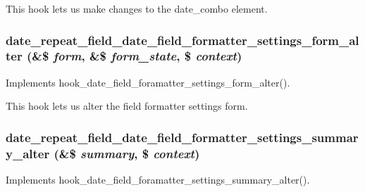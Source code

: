 This hook lets us make changes to the date\_\-combo element. \hypertarget{date__repeat__field_8module_af98bfac81550fc3d718f9b068c51e301}{
\subsubsection[{date\_\-repeat\_\-field\_\-date\_\-field\_\-formatter\_\-settings\_\-form\_\-alter}]{\setlength{\rightskip}{0pt plus 5cm}date\_\-repeat\_\-field\_\-date\_\-field\_\-formatter\_\-settings\_\-form\_\-alter (\&\$ {\em form}, \/  \&\$ {\em form\_\-state}, \/  \$ {\em context})}}
\label{date__repeat__field_8module_af98bfac81550fc3d718f9b068c51e301}
Implements hook\_\-date\_\-field\_\-foramatter\_\-settings\_\-form\_\-alter().

This hook lets us alter the field formatter settings form. \hypertarget{date__repeat__field_8module_ae3af2e31103aa2a0fac483249a477529}{
\subsubsection[{date\_\-repeat\_\-field\_\-date\_\-field\_\-formatter\_\-settings\_\-summary\_\-alter}]{\setlength{\rightskip}{0pt plus 5cm}date\_\-repeat\_\-field\_\-date\_\-field\_\-formatter\_\-settings\_\-summary\_\-alter (\&\$ {\em summary}, \/  \$ {\em context})}}
\label{date__repeat__field_8module_ae3af2e31103aa2a0fac483249a477529}
Implements hook\_\-date\_\-field\_\-foramatter\_\-settings\_\-summary\_\-alter().

